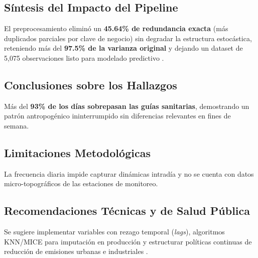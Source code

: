 \documentclass[journal,twocolumn,spanish]{IEEEtran}
\begin{document}
\subsection{Síntesis del Impacto del Pipeline}
El preprocesamiento eliminó un \textbf{45.64\% de redundancia exacta} (más duplicados parciales por clave de negocio) sin degradar la estructura estocástica, reteniendo más del \textbf{97.5\% de la varianza original} y dejando un dataset de 5,075 observaciones listo para modelado predictivo \cite{Pedregosa2011}.

\subsection{Conclusiones sobre los Hallazgos}
Más del \textbf{93\% de los días sobrepasan las guías sanitarias}, demostrando un patrón antropogénico ininterrumpido sin diferencias relevantes en fines de semana.

\subsection{Limitaciones Metodológicas}
La frecuencia diaria impide capturar dinámicas intradía y no se cuenta con datos micro-topográficos de las estaciones de monitoreo.

\subsection{Recomendaciones Técnicas y de Salud Pública}
Se sugiere implementar variables con rezago temporal (\emph{lags}), algoritmos KNN/MICE para imputación en producción y estructurar políticas continuas de reducción de emisiones urbanas e industriales \cite{Rivas2022}.
\end{document}
